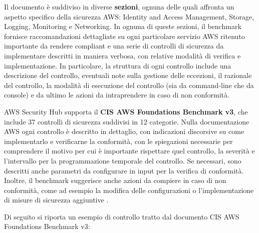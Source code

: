 Il documento è suddiviso in diverse \textbf{sezioni}, ognuna delle quali affronta un aspetto specifico della sicurezza AWS: Identity and Access Management, Storage, Logging, Monitoring e Networking. In ognuna di queste sezioni, il benchmark fornisce raccomandazioni dettagliate su ogni particolare servizio AWS ritenuto importante da rendere compliant e una serie di controlli di sicurezza da implementare descritti in maniera verbosa, con relative modalità di verifica e implementazione. In particolare, la struttura di ogni controllo include una descrizione del controllo, eventuali note sulla gestione delle eccezioni, il razionale del controllo, la modalità di esecuzione del controllo (sia da command-line che da console) e da ultimo le azioni da intraprendere in caso di non conformità. 

AWS Security Hub supporta il \textbf{CIS AWS Foundations Benchmark v3}, che include 37 controlli di sicurezza suddivisi in 12 categorie. Nulla documentazione AWS ogni controllo è descritto in dettaglio, con indicazioni discorsive su come implementarlo e verificarne la conformità, con le spiegazioni necessarie per comprendere il motivo per cui è importante rispettare quel controllo, la severità e l'intervallo per la programmazione temporale del controllo. Se necessari, sono descritti anche parametri da configurare in input per la verifica di conformità. Inoltre, il benchmark suggerisce anche azioni da compiere in caso di non conformità, come ad esempio la modifica delle configurazioni o l'implementazione di misure di sicurezza aggiuntive \cite{cisawsbenchmarkv3}.

Di seguito si riporta un esempio di controllo tratto dal documento CIS AWS Foundations Benchmark v3:

